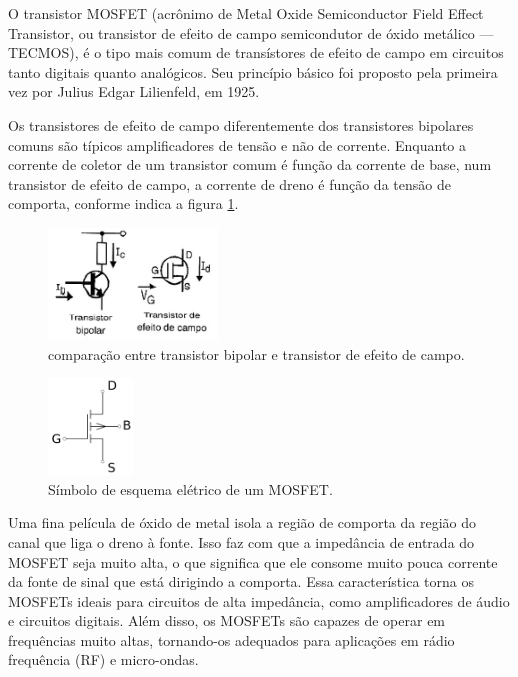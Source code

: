 \documentclass[12pt]{article}
\begin{document}
    O transistor MOSFET (acrônimo de Metal Oxide Semiconductor Field Effect Transistor, ou transistor de efeito de campo semicondutor de óxido metálico — TECMOS), é o tipo mais comum de transístores de efeito de campo em circuitos tanto digitais quanto analógicos. Seu princípio básico foi proposto pela primeira vez por Julius Edgar Lilienfeld, em 1925.

    Os transistores de efeito de campo diferentemente dos transistores bipolares comuns são típicos amplificadores de tensão e não de corrente. Enquanto a corrente de coletor de um transistor comum é função da corrente de base, num transistor de efeito de campo, a corrente de dreno é função da tensão de comporta, conforme indica a figura \ref{fig:comparacao}.

        \begin{figure}[htpb!]

            \centering
            \includegraphics[width=0.4\textwidth]{./images/transisCampo.jpg}
            \caption{comparação entre transistor bipolar e transistor de efeito de campo.}
            \label{fig:comparacao}

        \end{figure}

        \begin{figure}[htpb!]

            \centering
            \includegraphics[width=0.2\textwidth]{./images/Mosfet-wp.svg.png}
            \caption{Símbolo de esquema elétrico de um MOSFET.}

        \end{figure}

        Uma fina película de óxido de metal isola a região de comporta da região do canal que liga o dreno à fonte. Isso faz com que a impedância de entrada do MOSFET seja muito alta, o que significa que ele consome muito pouca corrente da fonte de sinal que está dirigindo a comporta. Essa característica torna os MOSFETs ideais para circuitos de alta impedância, como amplificadores de áudio e circuitos digitais. Além disso, os MOSFETs são capazes de operar em frequências muito altas, tornando-os adequados para aplicações em rádio frequência (RF) e micro-ondas.
\end{document}
